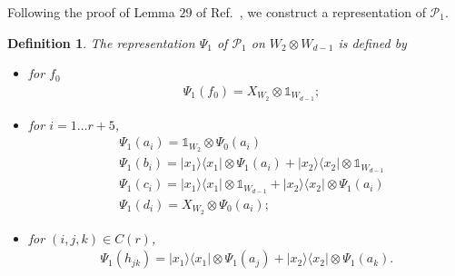 \documentclass[11pt,letterpaper]{article}
\newcommand{\ketbra}[2]{|#1\rangle\langle#2|}
\newcommand{\x}{\otimes}
\newcommand{\1}{\mathbb{1}}
\newcommand{\Pg}{\mathcal{P}}
\newtheorem{definition}[theorem]{Definition}
\theoremstyle{definition}
\begin{document}
Following the proof of Lemma $29$ of Ref.~\cite{slofstra2017}, we construct a representation of $\Pg_1$.
\begin{definition}
\label{def:rep_g1}
The representation $\Psi_1$ of $\Pg_1$ on $W_2 \x W_{d-1}$ is defined by
\begin{itemize}
\item for $f_0$
\begin{align*}
	&\Psi_1(f_0) = X_{W_2} \x \1_{W_{d-1}};
\end{align*}
\item
for $i = 1 \dots r+5$,
\begin{align*}
	&\Psi_1(a_i) = \1_{W_2} \x \Psi_0(a_i) \\
	&\Psi_1(b_i) = \ketbra{x_1}{x_1} \x \Psi_1(a_i) + \ketbra{x_2}{x_2} \x \1_{W_{d-1}} \\
	&\Psi_1(c_i) =\ketbra{x_1}{x_1} \x \1_{W_{d-1}} + \ketbra{x_2}{x_2} \x \Psi_1(a_i) \\
	&\Psi_1(d_i) =  X_{W_2} \x \Psi_0(a_i);
\end{align*}
\item for $(i,j,k) \in C(r)$,
\begin{align*}
	\Psi_1(h_{jk}) = \ketbra{x_1}{x_1} \x \Psi_1(a_j) + \ketbra{x_2}{x_2} \x \Psi_1(a_k).
\end{align*}
\end{itemize}
\end{definition}
\end{document}
